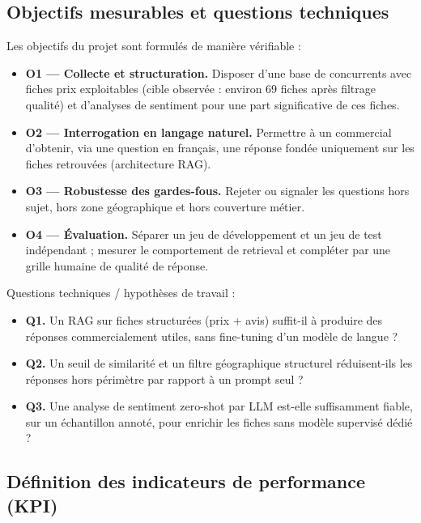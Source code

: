 \subsection{Objectifs mesurables et questions techniques}

Les objectifs du projet sont formulés de manière vérifiable :
\begin{itemize}
    \item \textbf{O1 --- Collecte et structuration.} Disposer d'une base de concurrents avec fiches prix
    exploitables (cible observée : environ 69 fiches après filtrage qualité) et d'analyses de sentiment
    pour une part significative de ces fiches.
    \item \textbf{O2 --- Interrogation en langage naturel.} Permettre à un commercial d'obtenir, via une
    question en français, une réponse fondée uniquement sur les fiches retrouvées (architecture RAG).
    \item \textbf{O3 --- Robustesse des gardes-fous.} Rejeter ou signaler les questions hors sujet, hors
    zone géographique et hors couverture métier.
    \item \textbf{O4 --- Évaluation.} Séparer un jeu de développement et un jeu de test indépendant ;
    mesurer le comportement de retrieval et compléter par une grille humaine de qualité de réponse.
\end{itemize}

Questions techniques / hypothèses de travail :
\begin{itemize}
    \item \textbf{Q1.} Un RAG sur fiches structurées (prix + avis) suffit-il à produire des réponses
    commercialement utiles, sans fine-tuning d'un modèle de langue ?
    \item \textbf{Q2.} Un seuil de similarité et un filtre géographique structurel réduisent-ils les
    réponses hors périmètre par rapport à un prompt seul ?
    \item \textbf{Q3.} Une analyse de sentiment zero-shot par LLM est-elle suffisamment fiable, sur un
    échantillon annoté, pour enrichir les fiches sans modèle supervisé dédié ?
\end{itemize}

\subsection{Définition des indicateurs de performance (KPI)}

